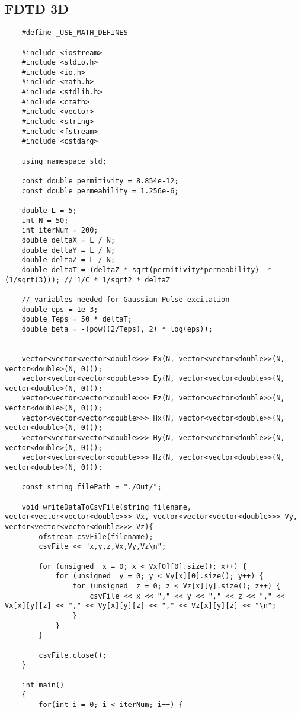 \subsection{FDTD 3D}
\begin{verbatim}
	#define _USE_MATH_DEFINES
	
	#include <iostream>
	#include <stdio.h>
	#include <io.h>
	#include <math.h>
	#include <stdlib.h>
	#include <cmath>
	#include <vector>
	#include <string>
	#include <fstream>
	#include <cstdarg>
	
	using namespace std;
	
	const double permitivity = 8.854e-12;
	const double permeability = 1.256e-6;
	
	double L = 5;
	int N = 50;
	int iterNum = 200;
	double deltaX = L / N;
	double deltaY = L / N;
	double deltaZ = L / N;
	double deltaT = (deltaZ * sqrt(permitivity*permeability)  * (1/sqrt(3))); // 1/C * 1/sqrt2 * deltaZ
	
	// variables needed for Gaussian Pulse excitation
	double eps = 1e-3;
	double Teps = 50 * deltaT;
	double beta = -(pow((2/Teps), 2) * log(eps));
	
	
	vector<vector<vector<double>>> Ex(N, vector<vector<double>>(N, vector<double>(N, 0)));
	vector<vector<vector<double>>> Ey(N, vector<vector<double>>(N, vector<double>(N, 0)));
	vector<vector<vector<double>>> Ez(N, vector<vector<double>>(N, vector<double>(N, 0)));
	vector<vector<vector<double>>> Hx(N, vector<vector<double>>(N, vector<double>(N, 0)));
	vector<vector<vector<double>>> Hy(N, vector<vector<double>>(N, vector<double>(N, 0)));
	vector<vector<vector<double>>> Hz(N, vector<vector<double>>(N, vector<double>(N, 0)));
	
	const string filePath = "./Out/";
	
	void writeDataToCsvFile(string filename, vector<vector<vector<double>>> Vx, vector<vector<vector<double>>> Vy, vector<vector<vector<double>>> Vz){
		ofstream csvFile(filename);
		csvFile << "x,y,z,Vx,Vy,Vz\n";
		
		for (unsigned  x = 0; x < Vx[0][0].size(); x++) {
			for (unsigned  y = 0; y < Vy[x][0].size(); y++) {
				for (unsigned  z = 0; z < Vz[x][y].size(); z++) {
					csvFile << x << "," << y << "," << z << "," << Vx[x][y][z] << "," << Vy[x][y][z] << "," << Vz[x][y][z] << "\n";
				}
			}
		}
		
		csvFile.close();
	}
	
	int main()
	{
		for(int i = 0; i < iterNum; i++) {
			

\end{verbatim}
